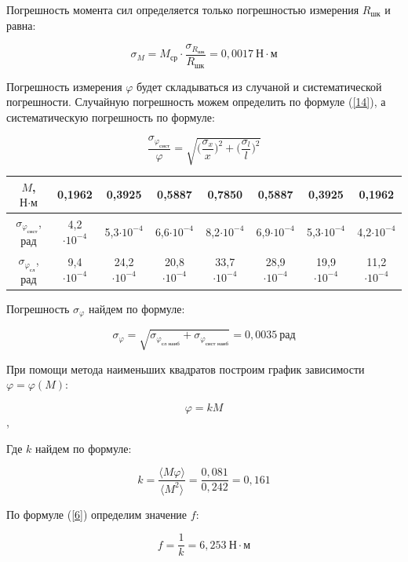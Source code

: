\documentclass[12pt,a4paper]{article}
\begin{document}
\vspace{0,5cm}

Погрешность момента сил определяется только погрешностью измерения $R_{\text{шк}}$ и равна:

\[\sigma_M = M_\text{ср}\cdot \frac{\sigma_{R_{\text{шк}}}}{R_{\text{шк}}} = 0,0017 \:\text{Н} \cdot \text{м}\]

Погрешность измерения $\varphi$ будет складываться из случаной и систематической погрешности. Случайную погрешность можем определить по формуле (\ref{14}), а систематическую погрешность по формуле:

\[\frac{\sigma_{\varphi_{\textit{сист}}}}{\varphi} = \sqrt{\Big( \frac{\sigma_x}{x}
\Big) ^2 + \Big( \frac{\sigma_l}{l} \Big) ^2}\]

\vspace{0,5cm}

\begin{tabular}{|c|c|c|c|c|c|c|c|}
\hline
$M$, $\text{Н} \cdot \text{м}$ & 0,1962 & 0,3925 & 0,5887 & 0,7850 & 0,5887 & 0,3925 & 0,1962 \\
\hline
$\sigma_{\varphi_{\textit{сист}}} $, рад& 4,2$\cdot 10^{-4}$ & 5,3$\cdot 10^{-4}$ & 6,6$\cdot 10^{-4}$ & 8,2$\cdot 10^{-4}$ & 6,9$\cdot 10^{-4}$ & 5,3$\cdot 10^{-4}$ & 4,2$\cdot 10^{-4}$ \\
\hline
$\sigma_{\varphi_{\textit{сл}}} $, рад& 9,4$\cdot 10^{-4}$ & 24,2$\cdot 10^{-4}$ & 20,8$\cdot 10^{-4}$ & 33,7$\cdot 10^{-4}$ & 28,9$\cdot 10^{-4}$ & 19,9$\cdot 10^{-4}$ & 11,2$\cdot 10^{-4}$ \\
\hline
\end{tabular}

\vspace{0,5cm}

Погрешность $\sigma_{\varphi}$ найдем по формуле:

\[\sigma_{\varphi} = \sqrt{\sigma_{\varphi_{\text{сл наиб}}} + \sigma_{\varphi_{\text{сист наиб}}}} = 0,0035 \:\text{рад}\]

При помощи метода наименьших квадратов построим график зависимости $\varphi = \varphi(\textit{M})$:

\[\varphi = k\textit{M}\],

Где $k$ найдем по формуле:

\[k = \frac{\langle M \varphi \rangle}{\langle M^2 \rangle} = \frac{0,081}{0,242} = 0,161 \]

По формуле (\ref{6}) определим значение $\textit{f}$:

\[\textit{f} = \frac{1}{k} = 6,253 \: \text{Н} \cdot \text{м}\]
\end{document}
